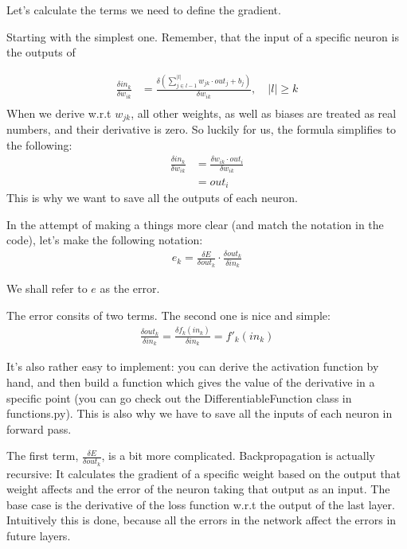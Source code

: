 \documentclass[a4paper, 12pt, finnish]{article}
\begin{document}
  Let's calculate the terms we need to define the gradient.

  Starting with the simplest one. Remember, that the input of a specific neuron is the outputs of

  \begin{align*}
    \frac{\delta in_k}{\delta w_{ik}} &= \frac{\delta \left(\sum^{|l|}_{j \in l-1} w_{jk}\cdot out_j + b_{j}\right)}{\delta w_{ik}}, \quad |l| \geq k \\
  \end{align*}
  When we derive w.r.t $w_{jk}$, all other weights, as well as biases are treated as real numbers, and their derivative is zero. So luckily for us, the formula simplifies to the following:
  \begin{align*}
    \frac{\delta in_k}{\delta w_{ik}} &= \frac{\delta w_{ik}\cdot out_{i}}{\delta w_{ik}} \\
    &= out_i
  \end{align*}
  This is why we want to save all the outputs of each neuron.

  In the attempt of making a things more clear (and match the notation in the code), let's make the following notation:
  \begin{align*}
    e_k=\frac{\delta E}{\delta out_k} \cdot \frac{\delta out_k}{\delta in_k}
  \end{align*}

  We shall refer to $e$ as the error.

  The error consits of two terms. The second one is nice and simple:
  \begin{align*}
    \frac{\delta out_k}{\delta in_k} = \frac{\delta f_k(in_k)}{\delta in_k} = f'_k(in_k)
  \end{align*}

  It's also rather easy to implement: you can derive the activation function by hand, and then build a function which gives the value of the derivative in a specific point (you can go check out the DifferentiableFunction class in functions.py). This is also why we have to save all the inputs of each neuron in forward pass.

  The first term, $\frac{\delta E}{\delta out_k} $, is a bit more complicated. Backpropagation is actually recursive: It calculates the gradient of a specific weight based on the output that weight affects and the error of the neuron taking that output as an input. The base case is the derivative of the loss function w.r.t the output of the last layer. Intuitively this is done, because all the errors in the network affect the errors in future layers.
\end{document}
